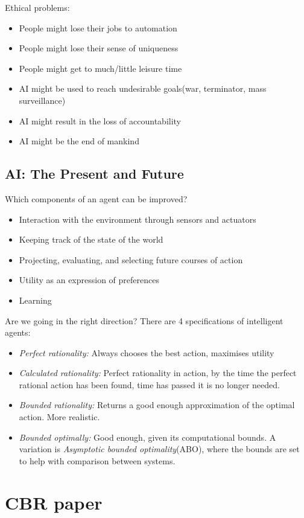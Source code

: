 \documentclass[11pt, letterpaper]{report}
\numberwithin{equation}{section}
\begin{document}
Ethical problems:
\begin{itemize}
\item People might lose their jobs to automation
\item People might lose their sense of uniqueness
\item People might get to much/little leisure time
\item AI might be used to reach undesirable goals(war, terminator, mass surveillance)
\item AI might result in the loss of accountability
\item AI might be the end of mankind
\end{itemize}

\section{AI: The Present and Future}
Which components of an agent can be improved?
\begin{itemize}
\item Interaction with the environment through sensors and actuators
\item Keeping track of the state of the world
\item Projecting, evaluating, and selecting future courses of action
\item Utility as an expression of preferences
\item Learning
\end{itemize}

Are we going in the right direction? There are 4 specifications of intelligent agents:
\begin{itemize}
\item \emph{Perfect rationality:} Always chooses the best action, maximises utility
\item \emph{Calculated rationality:} Perfect rationality in action, by the time
  the perfect rational action has been found, time has passed it is no longer needed.
\item \emph{Bounded rationality:} Returns a good enough approximation of the
  optimal action. More realistic.
\item \emph{Bounded optimally:} Good enough, given its computational bounds. A
  variation is \emph{Asymptotic bounded optimality}(ABO), where the bounds are
  set to help with comparison between systems.
\end{itemize}

\setcounter{section}{0}
\chapter{CBR paper}
\end{document}
